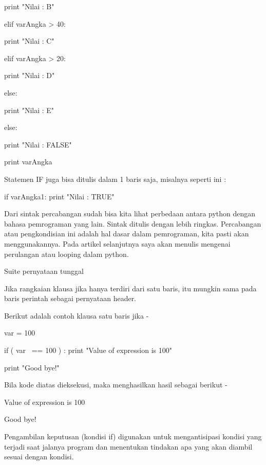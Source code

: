  
                                                print "Nilai : B" 

 
                       elif varAngka > 40: 

 
                                                print "Nilai : C" 

 
                       elif varAngka > 20: 

 
                                                print "Nilai : D" 

 
                       else: 

 
                                                print "Nilai : E" 

 
else: 

 
                       print "Nilai : FALSE" 

 
                       print varAngka 

 
Statemen IF juga bisa ditulis dalam 1 baris saja, misalnya seperti ini :  

 
if varAngka1: print "Nilai : TRUE" 

 
Dari sintak percabangan sudah bisa kita lihat perbedaan antara python dengan bahasa pemrograman yang lain. Sintak ditulis dengan lebih ringkas. Percabangan atau pengkondisian ini adalah hal dasar dalam pemrograman, kita pasti akan menggunakannya. Pada artikel selanjutnya saya akan menulis mengenai perulangan atau looping dalam python. 

 
Suite pernyataan tunggal 

 
Jika rangkaian   klausa   jika   hanya terdiri dari satu baris, itu mungkin sama pada baris perintah sebagai pernyataan header. 

 
Berikut adalah contoh   klausa   satu baris jika   - 


 
var = 100 

 
if ( var~ == 100 ) : print "Value of expression is 100" 

 
print "Good bye!" 

 
Bila kode diatas dieksekusi, maka menghasilkan hasil sebagai berikut - 

 
Value of expression is 100 

 
Good bye! \hspace*{1.31in}  
 

 
Pengambilan keputusan (kondisi if) digunakan untuk mengantisipasi kondisi yang terjadi saat jalanya program dan menentukan tindakan apa yang akan diambil sesuai dengan kondisi. 
 

